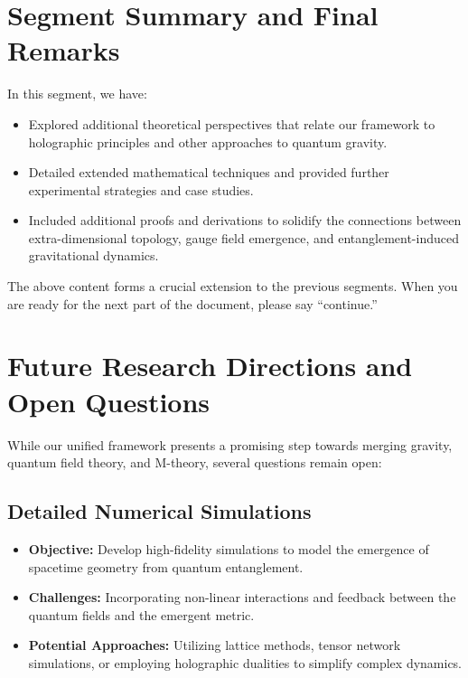 \documentclass[12pt, a4paper]{article}
\begin{document}
\section*{Segment Summary and Final Remarks}
In this segment, we have:
\begin{itemize}
    \item Explored additional theoretical perspectives that relate our framework to holographic principles and other approaches to quantum gravity.
    \item Detailed extended mathematical techniques and provided further experimental strategies and case studies.
    \item Included additional proofs and derivations to solidify the connections between extra-dimensional topology, gauge field emergence, and entanglement-induced gravitational dynamics.
\end{itemize}

The above content forms a crucial extension to the previous segments. When you are ready for the next part of the document, please say “continue.”

\section{Future Research Directions and Open Questions}
While our unified framework presents a promising step towards merging gravity, quantum field theory, and M-theory, several questions remain open:

\subsection{Detailed Numerical Simulations}
\begin{itemize}
    \item \textbf{Objective:} Develop high-fidelity simulations to model the emergence of spacetime geometry from quantum entanglement.
    \item \textbf{Challenges:} Incorporating non-linear interactions and feedback between the quantum fields and the emergent metric.
    \item \textbf{Potential Approaches:} Utilizing lattice methods, tensor network simulations, or employing holographic dualities to simplify complex dynamics.
\end{itemize}
\end{document}
